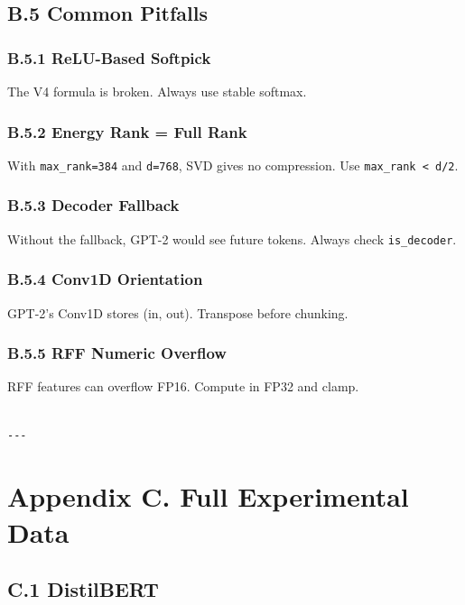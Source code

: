\subsection{B.5 Common Pitfalls}

\subsubsection{B.5.1 ReLU-Based Softpick}

The V4 formula is broken. Always use stable softmax.

\subsubsection{B.5.2 Energy Rank = Full Rank}

With \texttt{max\_rank=384} and \texttt{d=768}, SVD gives no compression. Use 
\texttt{max\_rank \textless{} d/2}.

\subsubsection{B.5.3 Decoder Fallback}

Without the fallback, GPT-2 would see future tokens. Always check 
\texttt{is\_decoder}.

\subsubsection{B.5.4 Conv1D Orientation}

GPT-2's Conv1D stores (in, out). Transpose before chunking.

\subsubsection{B.5.5 RFF Numeric Overflow}

RFF features can overflow FP16. Compute in FP32 and clamp.
\begin{lstlisting}

---
\end{lstlisting}

\section{Appendix C. Full Experimental Data}

\subsection{C.1 DistilBERT}


